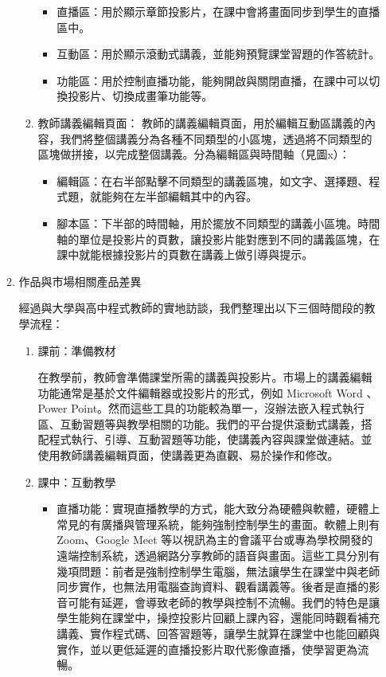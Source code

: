 \documentclass[12pt]{article}
\begin{document}
\begin{enumerate}
\begin{enumerate}
\begin{enumerate}[label=(\arabic*)]
            \begin{itemize}
              \item 直播區：用於顯示章節投影片，在課中會將畫面同步到學生的直播區中。
              \item 互動區：用於顯示滾動式講義，並能夠預覽課堂習題的作答統計。
              \item 功能區：用於控制直播功能，能夠開啟與關閉直播，在課中可以切換投影片、切換成畫筆功能等。
            \end{itemize}
          \item 教師講義編輯頁面：
          教師的講義編輯頁面，用於編輯互動區講義的內容，我們將整個講義分為各種不同類型的小區塊，透過將不同類型的區塊做拼接，以完成整個講義。分為編輯區與時間軸（見圖x）：
            \begin{itemize}
              \item 編輯區：在右半部點擊不同類型的講義區塊，如文字、選擇題、程式題，就能夠在左半部編輯其中的內容。
              \item 腳本區：下半部的時間軸，用於擺放不同類型的講義小區塊。時間軸的單位是投影片的頁數，讓投影片能對應到不同的講義區塊，在課中就能根據投影片的頁數在講義上做引導與提示。
            \end{itemize}
        \end{enumerate}
      \item 作品與市場相關產品差異
        \par 經過與大學與高中程式教師的實地訪談，我們整理出以下三個時間段的教學流程：
        \begin{enumerate}[label=(\arabic*)]
          \setlength{\parindent}{2em}
          \item 課前：準備教材
            \par 在教學前，教師會準備課堂所需的講義與投影片。市場上的講義編輯功能通常是基於文件編輯器或投影片的形式，例如 Microsoft Word 、Power Point。然而這些工具的功能較為單一，沒辦法嵌入程式執行區、互動習題等與教學相關的功能。我們的平台提供滾動式講義，搭配程式執行、引導、互動習題等功能，使講義內容與課堂做連結。並使用教師講義編輯頁面，使講義更為直觀、易於操作和修改。
          \item 課中：互動教學
            \begin{itemize}
              \item 直播功能：實現直播教學的方式，能大致分為硬體與軟體，硬體上常見的有廣播與管理系統，能夠強制控制學生的畫面。軟體上則有 Zoom、Google Meet 等以視訊為主的會議平台或專為學校開發的遠端控制系統，透過網路分享教師的語音與畫面。這些工具分別有幾項問題：前者是強制控制學生電腦，無法讓學生在課堂中與老師同步實作，也無法用電腦查詢資料、觀看講義等。後者是直播的影音可能有延遲，會導致老師的教學與控制不流暢。我們的特色是讓學生能夠在課堂中，操控投影片回顧上課內容，還能同時觀看補充講義、實作程式碼、回答習題等，讓學生就算在課堂中也能回顧與實作，並以更低延遲的直播投影片取代影像直播，使學習更為流暢。

\end{itemize}
\end{enumerate}
\end{enumerate}
\end{enumerate}
\end{document}
